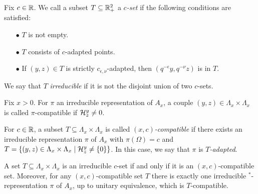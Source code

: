 \begin{Def} Fix $c\in \mathbb{R}$. We call a subset $T\subseteq \mathbb{R}_+^2$ a \emph{$c$-set} if the following conditions are satisfied: 
\begin{itemize} 
\item[$\bullet$] $T$ is not empty.
\item[$\bullet$] $T$ consists of $c$-adapted points.
\item[$\bullet$] If $(y,z)\in T$ is strictly $c_{\epsilon,\nu}$-adapted, then $(q^{-\epsilon}y,q^{-\nu}z)$ is in $T$.
\end{itemize}

We say that $T$ \emph{irreducible} if it is not the disjoint union of two $c$-sets.

\end{Def}

\begin{Def} Fix $x>0$. For $\pi$ an irreducible representation of $A_x$, a couple $(y,z)\in \Lambda_x\times \Lambda_x$ is called $\pi$-compatible if $\mathcal{H}^y_z\neq 0$. 

For $c\in \mathbb{R}$, a subset $T\subseteq \Lambda_x\times \Lambda_x$ is called \emph{$(x,c)$-compatible} if there exists an irreducible representation $\pi$ of $A_x$ with $\pi(\Omega) = c$ and $T=\{(y,z)\in \Lambda_x\times \Lambda_x\mid \mathcal{H}^{y}_{z}\neq \{0\}\}$. In this case, we say that $\pi$ is \emph{$T$-adapted}.
\end{Def}

\begin{Prop}\label{PropClassRep} A set $T\subseteq \Lambda_x\times \Lambda_x$ is an irreducible $c$-set if and only if it is an $(x,c)$-compatible set. Moreover, for any $(x,c)$-compatible set $T$ there is exactly one irreducible $^*$-representation $\pi$ of $A_x$, up to unitary equivalence, which is $T$-compatible.
\end{Prop}

